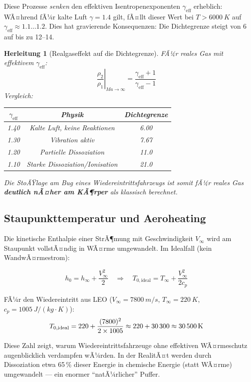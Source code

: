 ﻿\documentclass[12pt,a4paper]{article}
\newtheorem{herleitung}{Herleitung}[section]
\newcommand{\Ma}{M\!a}
\begin{document}
Diese Prozesse \emph{senken} den effektiven Isentropenexponenten $\gamma_{\text{eff}}$
erheblich: WÃ¤hrend fÃ¼r kalte Luft $\gamma = 1.4$ gilt, fÃ¤llt dieser Wert bei
$T > \SI{6000}{K}$ auf $\gamma_{\text{eff}} \approx 1.1\ldots1.2$. Dies hat
gravierende Konsequenzen: Die Dichtegrenze steigt von 6 auf bis zu 12--14.

\begin{herleitung}[Realgaseffekt auf die Dichtegrenze]
FÃ¼r reales Gas mit effektivem $\gamma_{\text{eff}}$:
\[
  \left.\frac{\rho_2}{\rho_1}\right|_{\Ma\to\infty}
    = \frac{\gamma_{\text{eff}}+1}{\gamma_{\text{eff}}-1}
\]
Vergleich:
\begin{center}
\begin{tabular}{ccc}
\toprule
$\gamma_{\text{eff}}$ & Physik & Dichtegrenze\\
\midrule
1.40 & Kalte Luft, keine Reaktionen     & 6.00\\
1.30 & Vibration aktiv                   & 7.67\\
1.20 & Partielle Dissoziation            & 11.0\\
1.10 & Starke Dissoziation/Ionisation    & 21.0\\
\bottomrule
\end{tabular}
\end{center}
Die \emph{StoÃŸlage am Bug} eines Wiedereintrittsfahrzeugs ist somit fÃ¼r reales Gas
\textbf{deutlich nÃ¤her am KÃ¶rper} als klassisch berechnet.
\end{herleitung}

\subsection{Staupunkttemperatur und Aeroheating}

Die kinetische Enthalpie einer StrÃ¶mung mit Geschwindigkeit $V_\infty$ wird am
Staupunkt vollstÃ¤ndig in WÃ¤rme umgewandelt. Im Idealfall (kein WandwÃ¤rmestrom):

\[
  h_0 = h_\infty + \frac{V_\infty^2}{2}
  \quad\Rightarrow\quad
  T_{0,\text{ideal}} = T_\infty + \frac{V_\infty^2}{2c_p}
\]

FÃ¼r den Wiedereintritt aus LEO ($V_\infty = \SI{7800}{m/s}$, $T_\infty = \SI{220}{K}$,
$c_p = \SI{1005}{J/(kg\cdot K)}$):
\[
  T_{0,\text{ideal}} = 220 + \frac{(7800)^2}{2\times1005}
    \approx 220 + 30\,300 \approx \SI{30\,500}{K}
\]

Diese Zahl zeigt, warum Wiedereintrittsfahrzeuge ohne effektiven WÃ¤rmeschutz
augenblicklich verdampfen wÃ¼rden. In der RealitÃ¤t werden durch Dissoziation etwa
65\,\% dieser Energie in chemische Energie (statt WÃ¤rme) umgewandelt --- ein
enormer ``natÃ¼rlicher'' Puffer.
\end{document}

